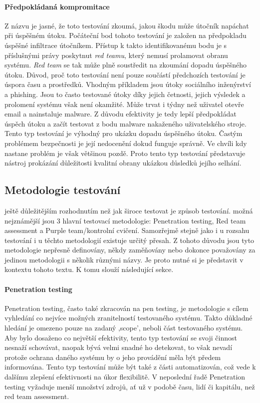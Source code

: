 \paragraph{Předpokládaná kompromitace}
Z názvu je jasné, že toto testování zkoumá, jakou škodu může útočník napáchat při úspěšném útoku.
Počáteční bod tohoto testování je založen na předpokladu úspěšné infiltrace útočníkem.
Přístup k takto identifikovanému bodu je s příslušnými právy poskytnut \textit{red teamu}, který nemusí prolamovat obranu systému.
\textit{Red team} se tak může plně soustředit na zkoumání dopadu úspěšného útoku.
Důvod, proč toto testování není pouze součástí předchozích testování je úspora času a prostředků.
Vhodným příkladem jsou útoky sociálního inženýrství a phishing.
Jsou to často testované útoky díky jejich četnosti, jejich výsledek a prolomení systému však není okamžité.
Může trvat i týdny než uživatel otevře email a nainstaluje malware.\cite{red_team_oakley_2019}
Z důvodu efektivity je tedy lepší předpokládat úspěch útoku a začít testovat z bodu malware nakaženého uživatelského stroje.
Tento typ testování je výhodný pro ukázku dopadu úspěšného útoku.
Častým problémem bezpečnosti je její nedocenění dokud funguje správně.
Ve chvíli kdy nastane problém je však většinou pozdě.
Proto tento typ testování představuje nástroj prokázání důležitosti kvalitní obrany ukázkou důsledků jejího selhání.

\subsection{Metodologie testování}%
ještě důležitějším rozhodnutím než jak široce testovat je způsob testování.
možná nejznámější jsou 3 hlavní testovací metodologie: Penetration testing, Red team assessment a Purple team/kontrolní cvičení.
Samozřejmě stejně jako i u rozsahu testování i u těchto metodologií existuje určitý přesah.
Z tohoto důvodu jsou tyto metodologie nepřesně definovány, někdy zaměňovány nebo dokonce považovány za jedinou metodologii s několik různými názvy.
Je proto nutné si je představit v kontextu tohoto textu.
K tomu slouží následující sekce.\cite{securityInteligence_pen_test_red_team_purple_team}

\paragraph{Penetration testing}

Penetration testing, často také zkracován na pen testing, je metodologie s cílem vyhledání co nejvíce možných zranitelností testovaného systému.
Takto důkladné hledání je omezeno pouze na zadaný ,scope', neboli část testovaného systému.
Aby bylo dosaženo co největší efektivity, tento typ testování se svoji činnost nesnaží schovávat, naopak bývá velmi snadné ho detekovat, to však nevadí protože ochrana daného systému by o jeho provádění měla být předem informována.
Tento typ testování může být také z části automatizován, což vede k dalšímu zlepšení efektivnosti na úkor flexibilitě.
V neposlední řadě Penetration testing vyžaduje menší množství zdrojů, ať už v podobě času, lidí či kapitálu, než red team assessment.
